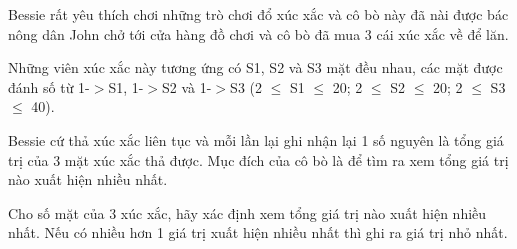Bessie rất yêu thích chơi những trò chơi đổ xúc xắc và cô bò này đã nài được bác nông dân John chở tới cửa hàng đồ chơi và cô bò đã mua 3 cái xúc xắc về để lăn.  

   Những viên xúc xắc này tương ứng có S1, S2 và S3 mặt đều nhau, các mặt được đánh  số từ 1-$>$S1, 1-$>$S2 và 1-$>$S3 (2  $\le$  S1  $\le$  20; 2  $\le$  S2  $\le$  20; 2  $\le$  S3  $\le$  40).  

   Bessie cứ thả xúc xắc liên tục và mỗi lần lại ghi nhận lại 1 số nguyên là tổng giá trị  của 3 mặt xúc xắc thả được. Mục đích của cô bò là để tìm ra xem tổng giá trị nào  xuất hiện nhiều nhất.  

   Cho số mặt của 3 xúc xắc, hãy xác định xem tổng giá trị nào xuất hiện nhiều nhất. Nếu có nhiều hơn 1 giá trị xuất hiện nhiều nhất thì ghi ra giá trị nhỏ nhất.